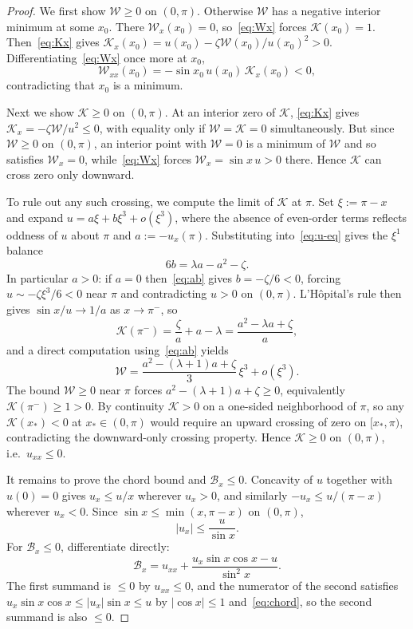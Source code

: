 \documentclass{amsart}
\begin{document}
\begin{proof}
We first show $\mathcal W\geq 0$ on $(0,\pi)$. Otherwise $\mathcal W$ has a negative
interior minimum at some $x_0$. There $\mathcal W_x(x_0)=0$, so~\eqref{eq:Wx}
forces $\mathcal K(x_0)=1$. Then~\eqref{eq:Kx} gives
$\mathcal K_x(x_0)=u(x_0)-\zeta\mathcal W(x_0)/u(x_0)^2>0$.
Differentiating~\eqref{eq:Wx} once more at $x_0$,
\[
\mathcal W_{xx}(x_0)=-\sin x_0\,u(x_0)\,\mathcal K_x(x_0)<0 ,
\]
contradicting that $x_0$ is a minimum.

Next we show $\mathcal K\geq 0$ on $(0,\pi)$. At an interior zero of $\mathcal K$,
\eqref{eq:Kx} gives $\mathcal K_x=-\zeta\mathcal W/u^2\leq 0$, with equality only if
$\mathcal W=\mathcal K=0$ simultaneously. But since $\mathcal W\geq 0$ on $(0,\pi)$, an interior
point with $\mathcal W=0$ is a minimum of $\mathcal W$ and so satisfies $\mathcal W_x=0$,
while~\eqref{eq:Wx} forces $\mathcal W_x=\sin x\,u>0$ there. Hence $\mathcal K$ can cross
zero only downward.

To rule out any such crossing, we compute the limit of $\mathcal K$ at $\pi$.
Set $\xi:=\pi-x$ and expand $u=a\xi+b\xi^3+o(\xi^3)$, where the
absence of even-order terms reflects oddness of $u$ about $\pi$ and
$a:=-u_x(\pi)$. Substituting into~\eqref{eq:u-eq} gives the $\xi^1$
balance
\begin{equation}\label{eq:ab}
6b=\lambda a-a^2-\zeta .
\end{equation}
In particular $a>0$: if $a=0$ then~\eqref{eq:ab} gives $b=-\zeta/6<0$,
forcing $u\sim-\zeta\xi^3/6<0$ near $\pi$ and contradicting $u>0$ on
$(0,\pi)$. L'H\^opital's rule then gives $\sin x/u\to 1/a$ as $x\to\pi^-$, so
\[
\mathcal K(\pi^-)=\frac{\zeta}{a}+a-\lambda=\frac{a^2-\lambda a+\zeta}{a},
\]
and a direct computation using~\eqref{eq:ab} yields
\[
\mathcal W=\frac{a^2-(\lambda+1)a+\zeta}{3}\,\xi^3+o(\xi^3).
\]
The bound $\mathcal W\geq 0$ near $\pi$ forces $a^2-(\lambda+1)a+\zeta\geq 0$,
equivalently $\mathcal K(\pi^-)\geq 1>0$. By continuity $\mathcal K>0$ on a one-sided
neighborhood of $\pi$, so any $\mathcal K(x_*)<0$ at $x_*\in(0,\pi)$ would
require an upward crossing of zero on $[x_*,\pi)$, contradicting the
downward-only crossing property. Hence $\mathcal K\geq 0$ on $(0,\pi)$, i.e.\
$u_{xx}\leq 0$.

It remains to prove the chord bound and $\mathcal B_x\leq 0$.
Concavity of $u$ together with $u(0)=0$ gives $u_x\leq u/x$ wherever
$u_x>0$, and similarly $-u_x\leq u/(\pi-x)$ wherever $u_x<0$. Since
$\sin x\leq\min(x,\pi-x)$ on $(0,\pi)$,
\begin{equation}\label{eq:chord}
|u_x|\leq\frac{u}{\sin x} .
\end{equation}
For $\mathcal B_x\leq 0$, differentiate directly:
\[
\mathcal B_x=u_{xx}+\frac{u_x\sin x\cos x-u}{\sin^2x}.
\]
The first summand is $\leq 0$ by $u_{xx}\leq 0$, and the numerator of
the second satisfies $u_x\sin x\cos x\leq|u_x|\sin x\leq u$ by
$|\cos x|\leq 1$ and~\eqref{eq:chord}, so the second summand is also
$\leq 0$.
\end{proof}
\end{document}

